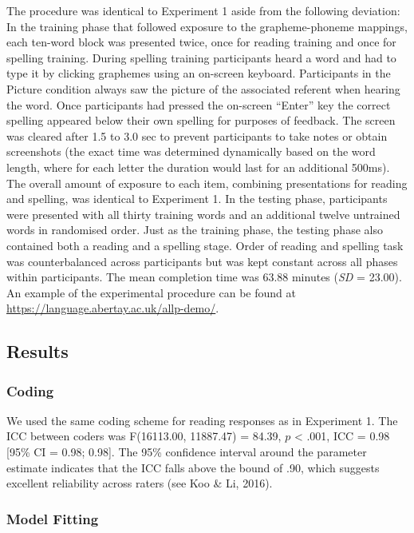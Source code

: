 \documentclass[doc,floatsintext]{apa6}
\begin{document}
The procedure was identical to Experiment 1 aside from the following
deviation: In the training phase that followed exposure to the
grapheme-phoneme mappings, each ten-word block was presented twice, once
for reading training and once for spelling training. During spelling
training participants heard a word and had to type it by clicking
graphemes using an on-screen keyboard. Participants in the Picture
condition always saw the picture of the associated referent when hearing
the word. Once participants had pressed the on-screen \enquote{Enter}
key the correct spelling appeared below their own spelling for purposes
of feedback. The screen was cleared after 1.5 to 3.0 sec to prevent
participants to take notes or obtain screenshots (the exact time was
determined dynamically based on the word length, where for each letter
the duration would last for an additional 500ms). The overall amount of
exposure to each item, combining presentations for reading and spelling,
was identical to Experiment 1. In the testing phase, participants were
presented with all thirty training words and an additional twelve
untrained words in randomised order. Just as the training phase, the
testing phase also contained both a reading and a spelling stage. Order
of reading and spelling task was counterbalanced across participants but
was kept constant across all phases within participants. The mean
completion time was 63.88 minutes (\emph{SD} = 23.00). An example of the
experimental procedure can be found at
\url{https://language.abertay.ac.uk/allp-demo/}.

\subsection{Results}\label{results-1}

\subsubsection{Coding}\label{coding-1}

We used the same coding scheme for reading responses as in Experiment 1.
The ICC between coders was F(16113.00, 11887.47) = 84.39, \(p\)
\textless{} .001, ICC = 0.98 {[}95\% CI = 0.98; 0.98{]}. The 95\%
confidence interval around the parameter estimate indicates that the ICC
falls above the bound of .90, which suggests excellent reliability
across raters (see Koo \& Li, 2016).

\subsubsection{Model Fitting}\label{model-fitting-1}
\end{document}
